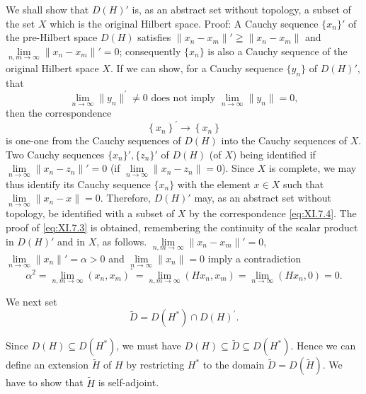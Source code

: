 We shall show that $D(H)'$ is, as an abstract set without topology, a subset of the set $X$ which is the original Hilbert space. Proof: A Cauchy sequence $\{x_n\}'$ of the pre-Hilbert space $D(H)$ satisfies $\| x_n - x_m \|' \geqq \| x_n - x_m \|$ and $\lim\limits_{n,m \to \infty} \| x_n - x_m \|' = 0$; consequently $\{x_n\}$ is also a Cauchy sequence of the original Hilbert space $X$. If we can show, for a Cauchy sequence $\{y_n\}$ of $D(H)'$, that 
\begin{equation}\label{eq:XI.7.3}
\lim\limits _{n \rightarrow \infty} \| y _{n} \| ^{\prime} \neq 0 \text{ does not imply } \lim\limits _{n \rightarrow \infty} \| y _{n} \| = 0,
\end{equation}
then the correspondence 
\begin{equation}\label{eq:XI.7.4}
\left\{x _{n} \right\} ^{\prime} \rightarrow \left\{x _{n} \right\}
\end{equation}
is one-one from the Cauchy sequences of $D(H)$ into the Cauchy sequences of $X$. Two Cauchy sequences $\{x_n\}', \{z_n\}'$ of $D(H)$ (of $X$) being identified if $\lim\limits_{n \to \infty} \|x_n - z_n\|' = 0$ (if $\lim\limits_{n \to \infty} \|x_n - z_n\| = 0$). Since $X$ is complete, we may thus identify its Cauchy sequence $\{x_n\}$ with the element $x \in X$ such that $\lim\limits_{n\to \infty}\|x_n - x\| = 0$. Therefore, $D(H)'$ may, as an abstract set without topology, be identified with a subset of $X$ by the correspondence \eqref{eq:XI.7.4}. The proof of \eqref{eq:XI.7.3} is obtained, remembering the continuity of the scalar product in $D(H)'$ and in $X$, as follows. $\lim\limits_{n,m\to \infty}\|x_n - x_m\|' = 0$, $\lim\limits_{n\to \infty}\|x_n\|' = \alpha > 0$ and $\lim\limits_{n\to \infty}\|x_n\| = 0$ imply a contradiction 
\[
\alpha^{2} = \lim\limits _{n, m \rightarrow \infty} (x _{n}, x _{m}) ^{\prime} = \lim\limits _{n, m \rightarrow \infty} (H x _{n}, x _{m}) = \lim\limits _{n \rightarrow \infty} (H x _{n}, 0) = 0.
\]

We next set 
\begin{equation}\label{eq:XI.7.5}
\tilde {D} = D (H ^{*}) \cap D (H) ^{\prime}.
\end{equation}

Since $D(H) \subseteq D(H^{*})$, we must have $D(H) \subseteq \tilde{D} \subseteq D(H^{*})$. Hence we can define an extension $\tilde{H}$ of $H$ by restricting $H^{*}$ to the domain $\tilde{D} = D(\tilde{H})$. We have to show that $\tilde{H}$ is self-adjoint. 

